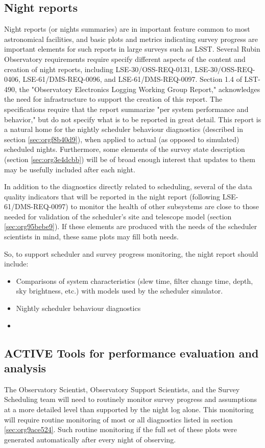 \subsection{Night reports}
\label{sec:org3c37641}
Night reports (or nights summaries) are in important feature common to most astronomical facilities, and basic plots and metrics indicating survey progress are important elements for such reports in large surveys such as LSST.
Several Rubin Observatory requirements require specify different aspects of the content and creation of night reports, including LSE-30/OSS-REQ-0131, LSE-30/OSS-REQ-0406, LSE-61/DMS-REQ-0096, and LSE-61/DMS-REQ-0097. Section 1.4 of LST-490, the "Observatory Electronics Logging Working Group Report," acknowledges the need for infrastructure to support the creation of this report.
The specifications require that the report summarize "per system performance and behavior," but do not specify what is to be reported in great detail.
This report is a natural home for the nightly scheduler behaviour diagnostics (described in section \ref{sec:orgf8b40d9}), when applied to actual (as opposed to simulated) scheduled nights.
Furthermore, some elements of the survey state description (section \ref{sec:org3e4dcbb}) will be of broad enough interest that updates to them may be usefully included after each night.

In addition to the diagnostics directly related to scheduling, several of the data quality indicators that will be reported in the night report (following LSE-61/DMS-REQ-0097) to monitor the health of other subsystems are close to those needed for validation of the scheduler's site and telescope model (section \ref{sec:org95bebe9}). If these elements are produced with the needs of the scheduler scientists in mind, these same plots may fill both needs.

So, to support scheduler and survey progress monitoring, the night report should include:
\begin{itemize}
\item Comparisons of system characteristics (slew time, filter change time, depth, sky brightness, etc.) with models used by the scheduler simulator.
\item Nightly scheduler behaviour diagnostics
\item 
\end{itemize}

\subsection{{\bfseries\sffamily ACTIVE} Tools for performance evaluation and analysis}
\label{sec:orge951653}
The Observatory Scientist, Observatory Support Scientists, and the Survey Scheduling team will need to routinely monitor survey progress and assumptions at a more detailed level than supported by the night log alone.
This monitoring will require routine monitoring of most or all diagnostics listed in section \ref{sec:org9ace524}. 
Such routine monitoring if the full set of these plots were generated automatically after every night of observing. 

